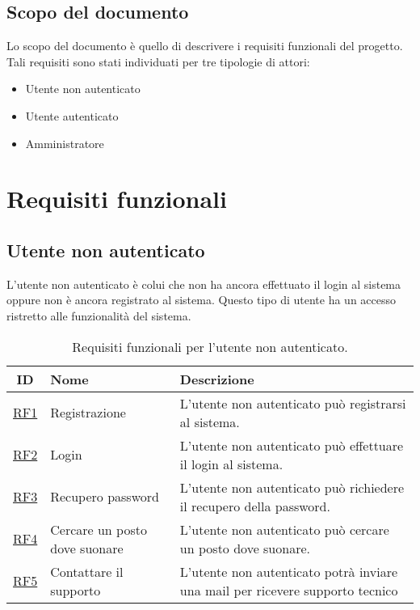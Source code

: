 \documentclass[12pt, a4paper]{article}
\begin{document}
\subsection{Scopo del documento}

Lo scopo del documento è quello di descrivere i requisiti funzionali del progetto.
Tali requisiti sono stati individuati per tre tipologie di attori:
\begin{itemize}
    \item Utente non autenticato
    \item Utente autenticato
    \item Amministratore
\end{itemize}

\section{Requisiti funzionali}
\subsection{Utente non autenticato}

L'utente non autenticato è colui che non ha ancora effettuato il login al sistema oppure non è ancora registrato al sistema. Questo tipo di utente ha un accesso ristretto alle funzionalità del sistema.



\begin{table}[h]
    \centering
    \label{tab:requisiti utente non autenticato}
    \begin{tabular}{|c|p{5cm}|p{5cm}|}
        \hline \textbf{ID}          & \textbf{Nome}                 & \textbf{Descrizione}                                                          \\  \hline
        \hline \hyperlink{RF1}{RF1} & Registrazione                 & L'utente non autenticato può registrarsi al sistema.                          \\ \hline
        \hline \hyperlink{RF2}{RF2} & Login                         & L'utente non autenticato può effettuare il login al sistema.                  \\ \hline
        \hline \hyperlink{RF3}{RF3} & Recupero password             & L'utente non autenticato può richiedere il recupero della password.           \\ \hline
        \hline \hyperlink{RF4}{RF4} & Cercare un posto dove suonare & L'utente non autenticato può cercare un posto dove suonare.                   \\ \hline
        \hline \hyperlink{RF5}{RF5} & Contattare il supporto        & L'utente non autenticato potrà inviare una mail per ricevere supporto tecnico \\ \hline
    \end{tabular}
    \caption{Requisiti funzionali per l'utente non autenticato.}
\end{table}
\end{document}
